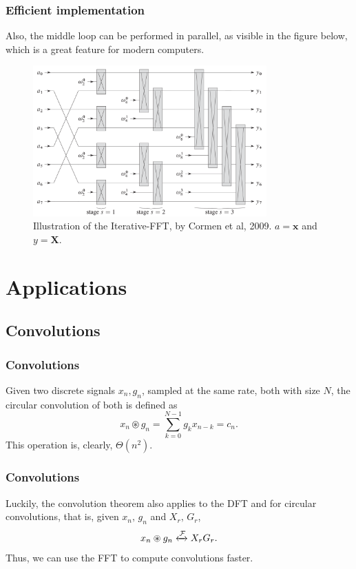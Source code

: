 \documentclass{beamer}
\begin{document}
\begin{frame}
    \frametitle{Efficient implementation}
    Also, the middle loop can be performed in parallel, as visible in the figure below, which is a great feature for modern computers.
    \begin{figure}
        \centering
        \includegraphics[width=0.8\textwidth]{cormen_fft_parallel.png}
        \caption{Illustration of the Iterative-FFT, by Cormen et al, 2009. $a = \bm{x}$ and $y = \bm{X}$.}
        \label{fig:cormen_fft_parallel-png}
    \end{figure}
\end{frame}

\section{Applications}

\subsection{Convolutions}

\begin{frame}
    \frametitle{Convolutions}
    Given two discrete signals $x_{n}, g_n$, sampled at the same rate, both with size $N$, the circular convolution of both is defined as \[
    x_{n}\circledast g_n = \sum_{k=0}^{N-1} g_k x_{n-k} = c_n
    .\] This operation is, clearly, $\Theta\left( n^2 \right) $.
\end{frame}

\begin{frame}
    \frametitle{Convolutions}
    Luckily, the convolution theorem also applies to the DFT and for circular convolutions, that is, given $x_{n},\,g_n$ and $X_r,\,G_r$, \[
    x_{n} \circledast g_n \xleftrightarrow{\mathcal{F}} X_r G_r
    .\] Thus, we can use the FFT to compute convolutions faster.
\end{frame}
\end{document}
